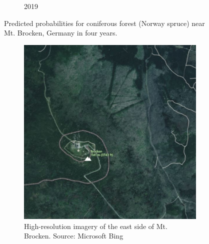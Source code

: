 \begin{figure}[H]
\begin{subfigure}[t]{0.22\textwidth}
        \caption{2019}
        \end{subfigure}
        \hfill
        \caption{Predicted probabilities for coniferous forest (Norway spruce) near Mt. Brocken, Germany in four years.}
        \label{fig:brocken_probabilities}
        \end{figure}

        \begin{figure}[H]
        \centering
        \begin{subfigure}[t]{0.24\textwidth}
        \centering
        \includegraphics[width=\linewidth,height=\linewidth]{figs_06/brocken_bing.png}
        \caption{High-resolution imagery of the east side of Mt. Brocken. Source: Microsoft Bing}
        \end{subfigure}
        \hfill
        \begin{subfigure}[t]{0.24\textwidth}
        \centering

\end{subfigure}
\end{figure}
